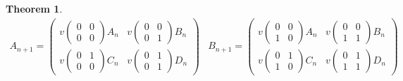 \documentclass[12pt]{article}
\theoremstyle{plain}
\newtheorem{thm}{Theorem}[section]
\theoremstyle{remark}
\theoremstyle{definition}
\theoremstyle{remark}
\theoremstyle{definition}
\begin{document}
\begin{thm}
\begin{eqnarray*}
A_{n+1}=\begin{pmatrix}v(\begin{smallmatrix}0 & 0\\ 0 & 0 \end{smallmatrix})A_{n} & v(\begin{smallmatrix}0 & 0\\ 0 & 1 \end{smallmatrix})B_{n}\\ v(\begin{smallmatrix}0 & 1\\ 0 & 0 \end{smallmatrix})C_{n} & v(\begin{smallmatrix}0 & 1\\ 0 & 1 \end{smallmatrix})D_{n} \end{pmatrix} & B_{n+1}=\begin{pmatrix}v(\begin{smallmatrix}0 & 0\\ 1 & 0 \end{smallmatrix})A_{n} & v(\begin{smallmatrix}0 & 0\\ 1 & 1 \end{smallmatrix})B_{n}\\ v(\begin{smallmatrix}0 & 1\\ 1 & 0 \end{smallmatrix})C_{n} & v(\begin{smallmatrix}0 & 1\\ 1 & 1 \end{smallmatrix})D_{n} \end{pmatrix}\\

\end{eqnarray*}
\end{thm}
\end{document}
